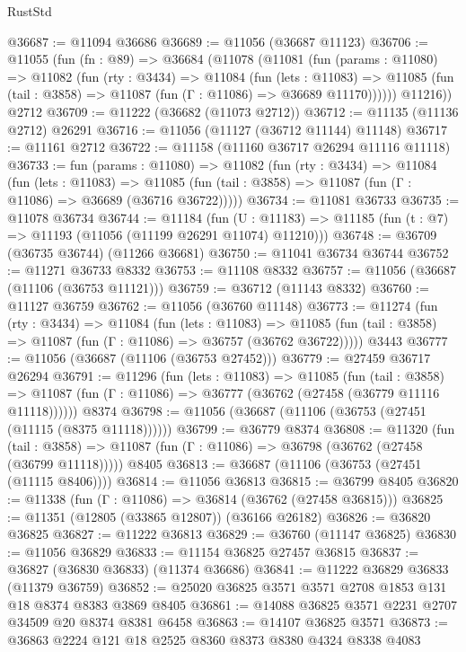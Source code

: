 \begin{lexlean}{RustStd}
\begin{coremodule}
@36687 := @11094 @36686
@36689 := @11056 (@36687 @11123)
@36706 := @11055
    (fun (fn : @89) =>
    @36684
      (@11078
        (@11081
          (fun (params : @11080) =>
          @11082
            (fun (rty : @3434) =>
            @11084
              (fun (lets : @11083) =>
              @11085 (fun (tail : @3858) => @11087 (fun (Γ : @11086) => @36689 @11170))))))
        @11216))
    @2712
@36709 := @11222 (@36682 (@11073 @2712))
@36712 := @11135 (@11136 @2712) @26291
@36716 := @11056 (@11127 (@36712 @11144) @11148)
@36717 := @11161 @2712
@36722 := @11158 (@11160 @36717 @26294 @11116 @11118)
@36733 := fun (params : @11080) =>
  @11082
    (fun (rty : @3434) =>
    @11084
      (fun (lets : @11083) =>
      @11085 (fun (tail : @3858) => @11087 (fun (Γ : @11086) => @36689 (@36716 @36722)))))
@36734 := @11081 @36733
@36735 := @11078 @36734
@36744 := @11184
    (fun (U : @11183) => @11185 (fun (t : @7) => @11193 (@11056 (@11199 @26291 @11074) @11210)))
@36748 := @36709 (@36735 @36744) (@11266 @36681)
@36750 := @11041 @36734 @36744
@36752 := @11271 @36733 @8332
@36753 := @11108 @8332
@36757 := @11056 (@36687 (@11106 (@36753 @11121)))
@36759 := @36712 (@11143 @8332)
@36760 := @11127 @36759
@36762 := @11056 (@36760 @11148)
@36773 := @11274
    (fun (rty : @3434) =>
    @11084
      (fun (lets : @11083) =>
      @11085 (fun (tail : @3858) => @11087 (fun (Γ : @11086) => @36757 (@36762 @36722)))))
    @3443
@36777 := @11056 (@36687 (@11106 (@36753 @27452)))
@36779 := @27459 @36717 @26294
@36791 := @11296
    (fun (lets : @11083) =>
    @11085
      (fun (tail : @3858) =>
      @11087 (fun (Γ : @11086) => @36777 (@36762 (@27458 (@36779 @11116 @11118))))))
    @8374
@36798 := @11056 (@36687 (@11106 (@36753 (@27451 (@11115 (@8375 @11118))))))
@36799 := @36779 @8374
@36808 := @11320
    (fun (tail : @3858) => @11087 (fun (Γ : @11086) => @36798 (@36762 (@27458 (@36799 @11118)))))
    @8405
@36813 := @36687 (@11106 (@36753 (@27451 (@11115 @8406))))
@36814 := @11056 @36813
@36815 := @36799 @8405
@36820 := @11338 (fun (Γ : @11086) => @36814 (@36762 (@27458 @36815)))
@36825 := @11351 (@12805 (@33865 @12807)) (@36166 @26182)
@36826 := @36820 @36825
@36827 := @11222 @36813
@36829 := @36760 (@11147 @36825)
@36830 := @11056 @36829
@36833 := @11154 @36825 @27457 @36815
@36837 := @36827 (@36830 @36833) (@11374 @36686)
@36841 := @11222 @36829 @36833 (@11379 @36759)
@36852 := @25020 @36825 @3571 @3571 @2708 @1853 @131 @18 @8374 @8383 @3869 @8405
@36861 := @14088 @36825 @3571 @2231 @2707 @34509 @20 @8374 @8381 @6458
@36863 := @14107 @36825 @3571
@36873 := @36863 @2224 @121 @18 @2525 @8360 @8373 @8380 @4324 @8338 @4083

\end{coremodule}
\end{lexlean}
